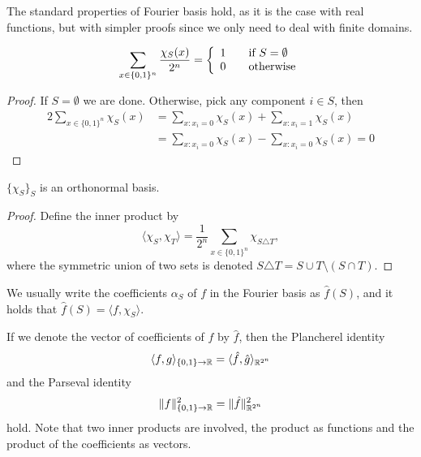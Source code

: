 \documentclass[a4paper,twoside,justified]{tufte-handout}
\begin{document}
The standard properties of Fourier basis hold, as it is the case with real functions, but with simpler proofs since we only need to deal with finite domains.

\begin{lemma}
\begin{align}
\sum_{x\in\{0,1\}^n}\frac{\chi_S(x)}{2^n}=\left\{ 
\begin{array}{l l}
    1 & \quad \text{if}\ S=\emptyset\\
    0 & \quad \text{otherwise}
\end{array} \right.
\end{align}
\end{lemma}
\begin{proof}
  If $S=\emptyset$ we are done. Otherwise, pick any component $i\in S$, then
\begin{alignat*}{2}
\sum_{x \in \{0,1\}^n} \chi_S(x) &= 
\sum_{x : x_i = 0} \chi_S(x) + \sum_{x : x_i = 1} \chi_S(x) \\ 
&= 
\sum_{x : x_i = 0} \chi_S(x) - \sum_{x : x_i = 0} \chi_S(x) = 0
\end{alignat*}
\end{proof}

\begin{lemma}
  $\{\chi_S\}_S$ is an orthonormal basis.
\end{lemma}
\begin{proof}
  Define the inner product by 
\[\langle \chi_S, \chi_T \rangle =\frac{1}{2^n}\sum_{x\in\{0,1\}^n}\chi_{S \triangle T},\]
where the symmetric union of two sets is denoted $S \triangle T = S \cup T \setminus (S \cap T)$.
\end{proof}

We usually write the coefficients $\alpha_S$ of $f$ in the Fourier basis as $\hat{f}(S)$, and it holds that $\hat{f}(S) = \langle f,\chi_S \rangle$.

If we denote the vector of coefficients of $f$ by $\hat f$, then the Plancherel identity
\begin{equation}\langle f,g \rangle_{\{0,1\}\to\mathbb{R}} = \langle \hat f, \hat g \rangle_{\mathbb{R}^{2^n}}\end{equation}
and the Parseval identity 
\begin{equation}
\|f\|_{\{0,1\}\to\mathbb{R}}^2=\|\hat f\|_{\mathbb{R}^{2^n}}^2
\end{equation}
hold. Note that two inner products are involved, the product as functions and the product of the coefficients as vectors.



\end{document}
